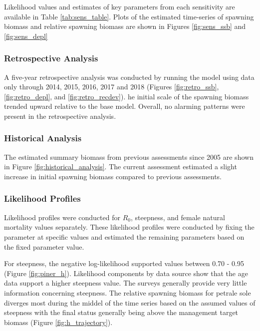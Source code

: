\documentclass[12pt,]{article}
\begin{document}
Likelihood values and estimates of key parameters from each sensitivity
are available in Table \ref{tab:sens_table}. Plots of the estimated
time-series of spawning biomass and relative spawning biomass are shown
in Figures \ref{fig:sens_ssb} and \ref{fig:sens_depl}

\subsubsection{Retrospective Analysis}\label{retrospective-analysis}

A five-year retrospective analysis was conducted by running the model
using data only through 2014, 2015, 2016, 2017 and 2018 (Figures
\ref{fig:retro_ssb}, \ref{fig:retro_depl}, and \ref{fig:retro_recdev}).
he initial scale of the spawning biomass trended upward relative to the
base model. Overall, no alarming patterns were present in the
retrospective analysis.

\subsubsection{Historical Analysis}\label{historical-analysis}

The estimated summary biomass from previous assessments since 2005 are
shown in Figure \ref{fig:historical_analysis}. The current assessment
estimated a slight increase in initial spawning biomass compared to
previous assessments.

\subsubsection{Likelihood Profiles}\label{likelihood-profiles}

Likelihood profiles were conducted for \(R_0\), steepness, and female
natural mortality values separately. These likelihood profiles were
conducted by fixing the parameter at specific values and estimated the
remaining parameters based on the fixed parameter value.

For steepness, the negative log-likelihood supported values between 0.70
- 0.95 (Figure \ref{fig:piner_h}). Likelihood components by data source
show that the age data support a higher steepness value. The surveys
generally provide very little information concerning steepness. The
relative spawning biomass for petrale sole diverges most during the
middel of the time series based on the assumed values of steepness with
the final status generally being above the management target biomass
(Figure \ref{fig:h_trajectory}).
\end{document}
